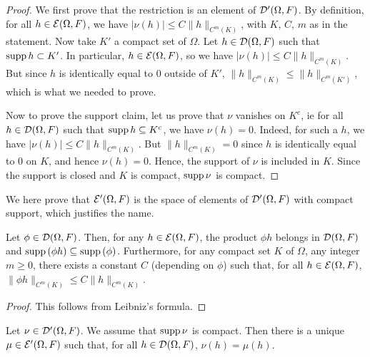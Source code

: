 \begin{proof}
  We first prove that the restriction is an element of $\distrib[\Omega,F]$.
  By definition, for all $h \in \smooth[\Omega,F]$, we have
  $|\nu(h)| \leq C \|h\|_{C^m(K)}$, with $K$, $C$, $m$ as in the statement.
  Now take $K'$ a compact set of $\Omega$.
  Let $h \in \testfunc[\Omega,F]$ such that $\supp h \subset K'$.
  In particular, $h \in \smooth[\Omega,F]$, so we have $|\nu(h)| \leq C \|h\|_{C^m(K)}$.
  But since $h$ is identically equal to $0$ outside of $K'$, $\|h\|_{C^m(K)} \leq \|h\|_{C^m(K')}$,
  which is what we needed to prove.

  Now to prove the support claim, let us prove that $\nu$ vanishes on $K^c$, ie
  for all $h \in \testfunc[\Omega,F]$ such that $\supp h \subseteq K^c$,
  we have $\nu(h)=0$. Indeed, for such a $h$,
  we have $|\nu(h)| \leq C \|h\|_{C^m(K)}$. But $\|h\|_{C^m(K)} = 0$ since $h$
  is identically equal to $0$ on $K$, and hence $\nu(h)=0$.
  Hence, the support of $\nu$ is included in $K$. Since the support is closed
  and $K$ is compact, $\supp \nu$ is compact.
\end{proof}

We here prove that $\csdistrib[\Omega, F]$ is the space of elements of $\distrib[\Omega,F]$
with compact support, which justifies the name.

\begin{lemma}
  \label{lem:Leibniz}
  Let $\phi \in \testfunc[\Omega,F]$. Then, for any $h \in \smooth[\Omega,F]$,
  the product $\phi h$ belongs in $\testfunc[\Omega,F]$
  and $\supp (\phi h) \subseteq \supp (\phi)$.
  Furthermore, for any compact set $K$ of $\Omega$, any integer $m \geq 0$,
  there exists a constant $C$ (depending on $\phi$)
  such that,
  for all $h \in \smooth[\Omega,F]$, $\|\phi h\|_{C^m(K)} \leq C \|h\|_{C^m(K)}$.
\end{lemma}

\begin{proof}
  This follows from Leibniz's formula.
\end{proof}

\begin{lemma}
  \label{lem:extension_csd}
  Let $\nu \in \distrib[\Omega, F]$. We assume that $\supp \nu$ is compact.
  Then there is a unique $\mu \in \csdistrib[\Omega,F]$
  such that, for all $h \in \testfunc[\Omega,F]$,
  $\nu(h)=\mu(h)$.
\end{lemma}

